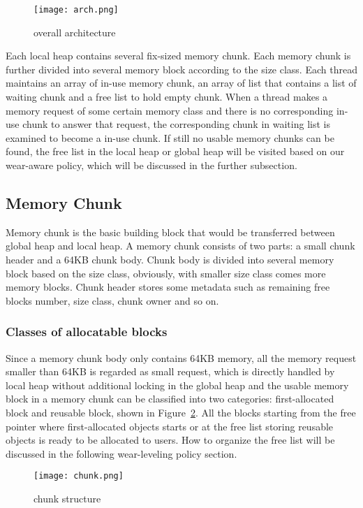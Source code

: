 \documentclass{vldb}
\begin{document}
\begin{figure}
\centering
\texttt{[image: arch.png]}
\caption{overall architecture}
\label{fig:arch}
\end{figure}

Each local heap contains several fix-sized memory chunk.
Each memory chunk is further divided into several memory block according to the size class.
Each thread maintains an array of in-use memory chunk, an array of list that contains a list of waiting chunk and a free list to hold empty chunk.
When a thread makes a memory request of some certain memory class and there is no corresponding in-use chunk to answer that request,
the corresponding chunk in waiting list is examined to become a in-use chunk. 
If still no usable memory chunks can be found,
the free list in the local heap or global heap will be visited based on our wear-aware policy,
which will be discussed in the further subsection.

\subsection{Memory Chunk}

Memory chunk is the basic building block that would be transferred between global heap and local heap. 
A memory chunk consists of two parts: a small chunk header and a 64KB chunk body. 
Chunk body is divided into several memory block based on the size class,
obviously, with smaller size class comes more memory blocks. 
Chunk header stores some metadata such as remaining free blocks number, size class, chunk owner and so on.

\subsubsection{Classes of allocatable blocks}
Since a memory chunk body only contains 64KB memory, all the memory request smaller than 64KB is regarded as small request,
which is directly handled by local heap without additional locking in the global heap and 
the usable memory block in a memory chunk can be classified into two categories: first-allocated block and reusable block,
shown in Figure~\ref{fig:chunk}.
All the blocks starting from the free pointer where first-allocated objects starts or at the free list storing reusable objects is ready to be allocated to users. How to organize the free list will be discussed in the following wear-leveling policy section.

\begin{figure}[h]
\centering
\texttt{[image: chunk.png]}
\caption{chunk structure}
\label{fig:chunk}
\end{figure}
\end{document}
